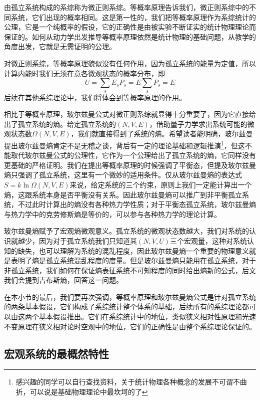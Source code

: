 \documentclass[../../main.tex]{subfiles}
\begin{document}
由孤立系统构成的系综称为微正则系综。等概率原理告诉我们，微正则系综中的不同系统，它们出现的概率相同。这是第一性的，我们把等概率原理作为系综统计的公理，它是一个纯概率的假设，它的正确性是由被实验不断证实的统计物理理论而保证的。如何从动力学出发推导等概率原理依然是统计物理的基础问题，从教学的角度出发，它就是无需证明的公理。

对微正则系综，等概率原理貌似没有任何作用，因为孤立系统的能量为定值，所以计算内能时我们无须在意各微观状态的概率分布，即
\begin{equation}
    U=\sum_s E_sP_s=E\sum_s P_s =E
\end{equation}
后续在其他系综理论中，我们将体会到等概率原理的作用。

相比于等概率原理，玻尔兹曼公式对微正则系综就显得十分重要了，因为它直接给出了孤立系统的熵。给定孤立系统的\(\left(N,V,E\right)\)，借助量子力学求出系统可能的微观状态数\(\Omega(N,V,E)\)，我们就直接得到了系统的熵。希望读者能明确，玻尔兹曼提出玻尔兹曼熵肯定不是无稽之谈，背后有一定的理论基础和逻辑推演\footnote{感兴趣的同学可以自行查找资料，关于统计物理各种概念的发展不可谓不曲折，可以说是基础物理理论中最坎坷的了}，但这不能取代玻尔兹曼公式的公理性，它作为一个公理给出了孤立系统的熵，它同样没有更基础的严格证明。我们在提出等概率原理的时候强调了平衡态，但提及玻尔兹曼熵只强调了孤立系统，这里有一个微妙的适用条件。仅从玻尔兹曼熵的表达式\(S=k\ln \Omega(N,V,E)\)来说，给定系统的三个约束，原则上我们一定能计算出一个熵，这跟系统本身是否平衡没有关系。因此玻尔兹曼熵可以推广到非平衡孤立系统，不过此时计算出的熵没有各种热力学性质；对于平衡态孤立系统，玻尔兹曼熵与热力学中的克劳修斯熵是等价的，可以参与各种热力学的理论计算。

玻尔兹曼熵赋予了宏观熵微观意义。孤立系统的微观状态数越大，我们对系统的认识就越少，因为对于孤立系统我们只知道其\((N,V,U)\)三个宏观量，这种对系统认知的缺失，也可以理解为系统的混乱程度，因此玻尔兹曼熵一个重要的物理意义就是表明了熵是孤立系统混乱程度的度量。但是玻尔兹曼熵只能用在孤立系统，对于非孤立系统，我们如何在保证熵表征系统不可知程度的同时给出熵新的公式，后文我们会提到吉布斯熵，回答这一问题。

在本小节的最后，我们要再次强调，等概率原理和玻尔兹曼熵公式是针对孤立系统的两条基本假设，它们构成了系综统计整个体系的基础，后续所有的系综理论都可以由这两个基本假设推出。它们在系综统计中的地位，类似狭义相对性原理和光速不变原理在狭义相对论时空观中的地位，它们的正确性是由整个系综理论保证的。

\subsection{宏观系统的最概然特性}\label{subsec:宏观系统的最概然特性}
\end{document}
